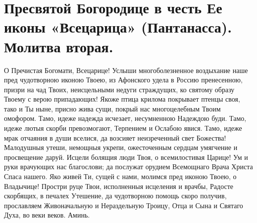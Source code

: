 \section{Пресвятой Богородице в честь Ее иконы «Всецарица» (Пантанасса). Молитва вторая.}\begin{mymulticols}

О Пречистая Богомати, Всецарице! Услыши многоболезненное воздыхание наше пред чудотворною иконою Твоею, из Афонского удела в Россию пренесенною, призри на чад Твоих, неисцельными недуги страждущих, ко святому образу Твоему с верою припадающих! Якоже птица крилома покрывает птенцы своя, тако и Ты ныне, присно жива сущи, покрый нас многоцелебным Твоим омофором. Тамо, идеже надежда исчезает, несумненною Надеждою буди. Тамо, идеже лютыя скорби превозмогают, Терпением и Ослабою явися. Тамо, идеже мрак отчаяния в души вселися, да возсияет неизреченный свет Божества! Малодушныя утеши, немощныя укрепи, ожесточенным сердцам умягчение и просвещение даруй. Исцели болящия люди Твоя, о всемилостивая Царице! Ум и руки врачующих нас благослови; да послужат орудием Всемощнаго Врача Христа Спаса нашего. Яко живей Ти, сущей с нами, молимся пред иконою Твоею, о Владычице! Простри руце Твои, исполненныя исцеления и врачбы, Радосте скорбящих, в печалех Утешение, да чудотворною помощь скоро получив, прославляем Живоначальную и Нераздельную Троицу, Отца и Сына и Святаго Духа, во веки веков. Аминь.

\end{mymulticols}

